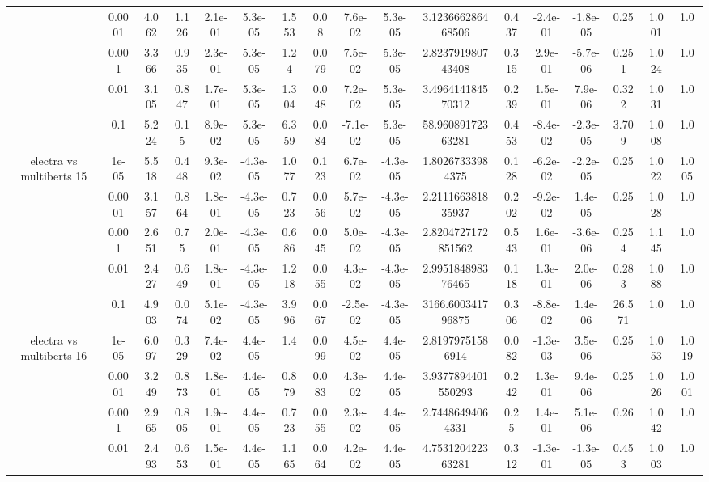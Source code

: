 \begin{tabular}{|c|c|c|c|c|c|c|c|c|c|c|c|c|c|c|c|c|}
 & 0.0001 & 4.062 & 1.126 & 2.1e-01 & 5.3e-05 & 1.553 & 0.08 & 7.6e-02 & 5.3e-05 & 3.123666286468506 & 0.437 & -2.4e-01 & -1.8e-05 & 0.25 & 1.001 & 1.0 \\
 & 0.001 & 3.366 & 0.935 & 2.3e-01 & 5.3e-05 & 1.24 & 0.079 & 7.5e-02 & 5.3e-05 & 2.823791980743408 & 0.315 & 2.9e-01 & -5.7e-06 & 0.251 & 1.024 & 1.0 \\
 & 0.01 & 3.105 & 0.847 & 1.7e-01 & 5.3e-05 & 1.304 & 0.048 & 7.2e-02 & 5.3e-05 & 3.496414184570312 & 0.239 & 1.5e-01 & 7.9e-06 & 0.322 & 1.031 & 1.0 \\
 & 0.1 & 5.224 & 0.15 & 8.9e-02 & 5.3e-05 & 6.359 & 0.084 & -7.1e-02 & 5.3e-05 & 58.96089172363281 & 0.453 & -8.4e-02 & -2.3e-05 & 3.709 & 1.008 & 1.0 \\
\hline
\multirow{5}{*}{electra  vs multiberts 15} & 1e-05 & 5.518 & 0.448 & 9.3e-02 & -4.3e-05 & 1.077 & 0.123 & 6.7e-02 & -4.3e-05 & 1.80267333984375 & 0.128 & -6.2e-02 & -2.2e-05 & 0.25 & 1.022 & 1.005 \\
 & 0.0001 & 3.157 & 0.864 & 1.8e-01 & -4.3e-05 & 0.723 & 0.056 & 5.7e-02 & -4.3e-05 & 2.211166381835937 & 0.202 & -9.2e-02 & 1.4e-05 & 0.25 & 1.028 & 1.0 \\
 & 0.001 & 2.651 & 0.75 & 2.0e-01 & -4.3e-05 & 0.686 & 0.045 & 5.0e-02 & -4.3e-05 & 2.8204727172851562 & 0.543 & 1.6e-01 & -3.6e-06 & 0.254 & 1.145 & 1.0 \\
 & 0.01 & 2.427 & 0.649 & 1.8e-01 & -4.3e-05 & 1.218 & 0.055 & 4.3e-02 & -4.3e-05 & 2.995184898376465 & 0.118 & 1.3e-01 & 2.0e-06 & 0.283 & 1.088 & 1.0 \\
 & 0.1 & 4.903 & 0.074 & 5.1e-02 & -4.3e-05 & 3.996 & 0.067 & -2.5e-02 & -4.3e-05 & 3166.600341796875 & 0.306 & -8.8e-02 & 1.4e-06 & 26.571 & 1.0 & 1.0 \\
\hline
\multirow{5}{*}{electra  vs multiberts 16} & 1e-05 & 6.097 & 0.329 & 7.4e-02 & 4.4e-05 & 1.4 & 0.099 & 4.5e-02 & 4.4e-05 & 2.81979751586914 & 0.082 & -1.3e-03 & 3.5e-06 & 0.25 & 1.053 & 1.019 \\
 & 0.0001 & 3.249 & 0.873 & 1.8e-01 & 4.4e-05 & 0.879 & 0.083 & 4.3e-02 & 4.4e-05 & 3.9377894401550293 & 0.242 & 1.3e-01 & 9.4e-06 & 0.25 & 1.026 & 1.001 \\
 & 0.001 & 2.965 & 0.805 & 1.9e-01 & 4.4e-05 & 0.723 & 0.055 & 2.3e-02 & 4.4e-05 & 2.74486494064331 & 0.25 & 1.4e-01 & 5.1e-06 & 0.26 & 1.042 & 1.0 \\
 & 0.01 & 2.493 & 0.653 & 1.5e-01 & 4.4e-05 & 1.165 & 0.064 & 4.2e-02 & 4.4e-05 & 4.753120422363281 & 0.312 & -1.3e-01 & -1.3e-05 & 0.453 & 1.003 & 1.0 \\

\end{tabular}

